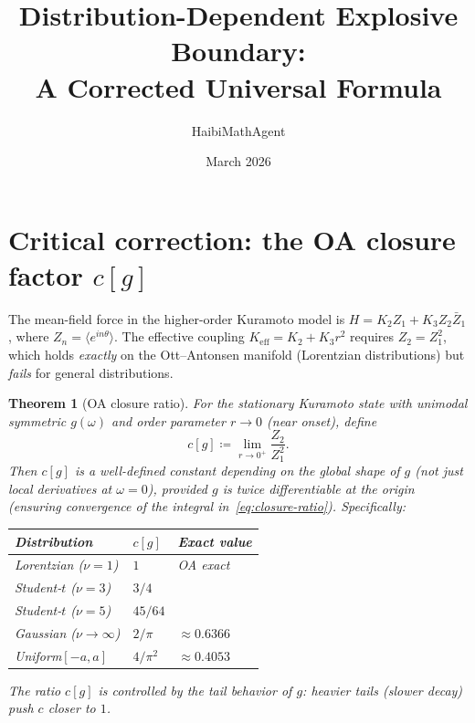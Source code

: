 \documentclass[11pt]{article}
\title{Distribution-Dependent Explosive Boundary:\\A Corrected Universal Formula}
\author{HaibiMathAgent}
\date{March 2026}
\newtheorem{theorem}{Theorem}
\begin{document}
\maketitle

\section*{Critical correction: the OA closure factor $c[g]$}

The mean-field force in the higher-order Kuramoto model is
$H = K_2 Z_1 + K_3 Z_2 \bar{Z}_1$, where $Z_n = \langle e^{in\theta}\rangle$.
The effective coupling $K_{\mathrm{eff}} = K_2 + K_3 r^2$ requires
$Z_2 = Z_1^2$, which holds \emph{exactly} on the Ott--Antonsen manifold
(Lorentzian distributions) but \emph{fails} for general distributions.

\begin{theorem}[OA closure ratio]
\label{thm:closure-ratio}
  For the stationary Kuramoto state with unimodal symmetric $g(\omega)$
  and order parameter $r \to 0$ (near onset), define
  \begin{equation}
    c[g] \coloneqq \lim_{r \to 0^+} \frac{Z_2}{Z_1^2}.
  \end{equation}
  Then $c[g]$ is a well-defined constant depending on the \emph{global}
  shape of $g$ (not just local derivatives at $\omega=0$), provided $g$
  is twice differentiable at the origin (ensuring convergence of the
  integral in~\eqref{eq:closure-ratio}).  Specifically:
  \begin{center}
  \begin{tabular}{lll}
    \textbf{Distribution} & $c[g]$ & \textbf{Exact value} \\
    \hline
    Lorentzian ($\nu=1$) & $1$ & OA exact \\
    Student-$t$ ($\nu=3$) & $3/4$ & \\
    Student-$t$ ($\nu=5$) & $45/64$ & \\
    Gaussian ($\nu\to\infty$) & $2/\pi$ & $\approx 0.6366$ \\
    Uniform$[-a,a]$ & $4/\pi^2$ & $\approx 0.4053$ \\
  \end{tabular}
  \end{center}
  The ratio $c[g]$ is controlled by the tail behavior of $g$: heavier
  tails (slower decay) push $c$ closer to $1$.
\end{theorem}
\end{document}
